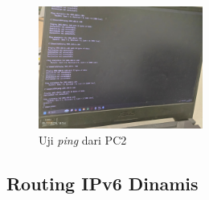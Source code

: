\begin{enumerate}
\begin{figure}[H]
    \centering
    \includegraphics[width=0.48\textwidth]{img/A2-2.jpeg}
    \caption{Uji \textit{ping} dari PC2}
    \label{fig:a2b}
\end{figure}
\end{enumerate}

\newpage
\subsection{Routing IPv6 Dinamis}

